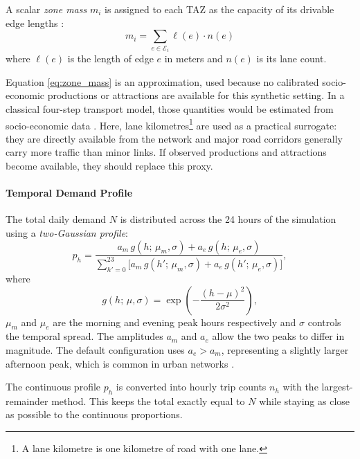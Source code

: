 A scalar \emph{zone mass} $m_i$ is assigned to each TAZ as the capacity of its drivable
edge lengths : 
\begin{equation}
  m_i = \sum_{e \in \mathcal{E}_i} \ell(e) \cdot n(e)
  \label{eq:zone_mass}
\end{equation}
where $\ell(e)$ is the length of edge $e$ in meters and $n(e)$ is its lane count. 

Equation \ref{eq:zone_mass} is an approximation, used because no calibrated
socio-economic productions or attractions are available for this synthetic
setting. In a classical four-step transport model, those quantities would be
estimated from socio-economic data \cite{modelling_transport}. Here, lane
kilometres\footnote{A lane kilometre is one kilometre of road with one lane.}
are used as a practical surrogate: they are directly available from the
network and major road corridors generally carry more traffic than minor
links. If observed productions and attractions become available, they should
replace this proxy.

\paragraph{Temporal Demand Profile}
\label{par:temporal_demand_profile}

The total daily demand $N$ is distributed across the 24 hours of the
simulation using a \emph{two\nobreakdash-Gaussian profile}:
\begin{equation}
  p_h = \frac{a_m\,g(h;\,\mu_m,\sigma) + a_e\,g(h;\,\mu_e,\sigma)}
             {\displaystyle\sum_{h'=0}^{23}
              \bigl[a_m\,g(h';\,\mu_m,\sigma)
                  + a_e\,g(h';\,\mu_e,\sigma)\bigr]},
  \label{eq:twopeak_gaussian}
\end{equation}
where 
\begin{equation}
  g(h;\,\mu,\sigma) = \exp\!\left(-\frac{(h-\mu)^2}{2\sigma^2}\right),
\end{equation}
$\mu_m$ and $\mu_e$ are the morning and evening peak hours respectively and
$\sigma$ controls the temporal spread. The amplitudes $a_m$ and $a_e$ allow
the two peaks to differ in magnitude. The default configuration uses
$a_e > a_m$, representing a slightly larger afternoon peak, which is common in
urban networks \cite{gaussian_book}.

The continuous profile $p_h$ is converted into hourly trip counts $n_h$ with
the largest-remainder method. This keeps the total exactly equal to $N$ while
staying as close as possible to the continuous proportions.

